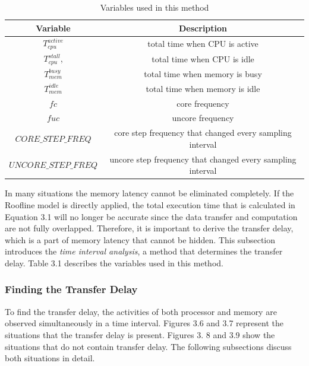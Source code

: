 \begin{table} %
	\centering      %
	\begin{tabular}{|c|c|} %
		\hline
		\textbf{Variable} & \textbf{Description}  \\
		\hline
		$T^{active}_{cpu}$               &total time when CPU is active                  \\
		\hline
		$T^{stall}_{cpu}$,	              & total time when CPU is idle              \\
		\hline
		$T^{busy}_{mem}$			& total time when memory is busy\\
		\hline				
		$T^{idle}_{mem}$				& total time when memory is idle\\
		\hline
		$fc$									& core frequency\\
		\hline
		$fuc$								& uncore frequency\\
		\hline
		$CORE\_STEP\_FREQ$  & core step frequency that changed every sampling interval\\
		\hline
		$UNCORE\_STEP\_FREQ$ & uncore step frequency that changed every sampling interval\\
		
		\hline
	\end{tabular}
	\caption{Variables used in this method}
\end{table}

In many situations the memory latency cannot be eliminated completely. If the Roofline model is directly applied, the total execution time that is calculated in Equation 3.1 will no longer be accurate since the data transfer and computation are not fully overlapped. Therefore, it is important to derive the transfer delay, which is a part of memory latency that cannot be hidden.  This subsection introduces the \textit{time interval analysis},  a method that determines the transfer delay. Table 3.1 describes the variables used in this method.




\subsubsection{Finding the Transfer Delay}

To find the transfer delay, the activities of both processor and memory are observed simultaneously in a time interval. Figures 3.6 and 3.7 represent the situations that the transfer delay is present. Figures 3. 8 and 3.9 show the situations that do not contain transfer delay. The following subsections discuss both situations in detail.

